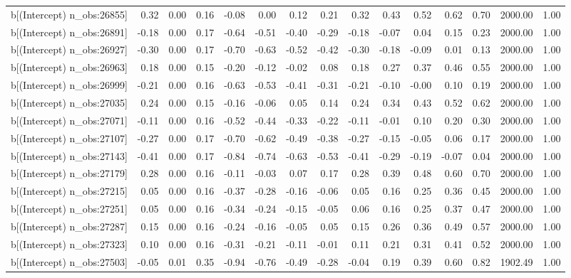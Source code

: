 \begin{table}[ht]
\begin{tabular}{rrrrrrrrrrrrrrr}
  b[(Intercept) n\_obs:26855] & 0.32 & 0.00 & 0.16 & -0.08 & 0.00 & 0.12 & 0.21 & 0.32 & 0.43 & 0.52 & 0.62 & 0.70 & 2000.00 & 1.00 \\ 
  b[(Intercept) n\_obs:26891] & -0.18 & 0.00 & 0.17 & -0.64 & -0.51 & -0.40 & -0.29 & -0.18 & -0.07 & 0.04 & 0.15 & 0.23 & 2000.00 & 1.00 \\ 
  b[(Intercept) n\_obs:26927] & -0.30 & 0.00 & 0.17 & -0.70 & -0.63 & -0.52 & -0.42 & -0.30 & -0.18 & -0.09 & 0.01 & 0.13 & 2000.00 & 1.00 \\ 
  b[(Intercept) n\_obs:26963] & 0.18 & 0.00 & 0.15 & -0.20 & -0.12 & -0.02 & 0.08 & 0.18 & 0.27 & 0.37 & 0.46 & 0.55 & 2000.00 & 1.00 \\ 
  b[(Intercept) n\_obs:26999] & -0.21 & 0.00 & 0.16 & -0.63 & -0.53 & -0.41 & -0.31 & -0.21 & -0.10 & -0.00 & 0.10 & 0.19 & 2000.00 & 1.00 \\ 
  b[(Intercept) n\_obs:27035] & 0.24 & 0.00 & 0.15 & -0.16 & -0.06 & 0.05 & 0.14 & 0.24 & 0.34 & 0.43 & 0.52 & 0.62 & 2000.00 & 1.00 \\ 
  b[(Intercept) n\_obs:27071] & -0.11 & 0.00 & 0.16 & -0.52 & -0.44 & -0.33 & -0.22 & -0.11 & -0.01 & 0.10 & 0.20 & 0.30 & 2000.00 & 1.00 \\ 
  b[(Intercept) n\_obs:27107] & -0.27 & 0.00 & 0.17 & -0.70 & -0.62 & -0.49 & -0.38 & -0.27 & -0.15 & -0.05 & 0.06 & 0.17 & 2000.00 & 1.00 \\ 
  b[(Intercept) n\_obs:27143] & -0.41 & 0.00 & 0.17 & -0.84 & -0.74 & -0.63 & -0.53 & -0.41 & -0.29 & -0.19 & -0.07 & 0.04 & 2000.00 & 1.00 \\ 
  b[(Intercept) n\_obs:27179] & 0.28 & 0.00 & 0.16 & -0.11 & -0.03 & 0.07 & 0.17 & 0.28 & 0.39 & 0.48 & 0.60 & 0.70 & 2000.00 & 1.00 \\ 
  b[(Intercept) n\_obs:27215] & 0.05 & 0.00 & 0.16 & -0.37 & -0.28 & -0.16 & -0.06 & 0.05 & 0.16 & 0.25 & 0.36 & 0.45 & 2000.00 & 1.00 \\ 
  b[(Intercept) n\_obs:27251] & 0.05 & 0.00 & 0.16 & -0.34 & -0.24 & -0.15 & -0.05 & 0.06 & 0.16 & 0.25 & 0.37 & 0.47 & 2000.00 & 1.00 \\ 
  b[(Intercept) n\_obs:27287] & 0.15 & 0.00 & 0.16 & -0.24 & -0.16 & -0.05 & 0.05 & 0.15 & 0.26 & 0.36 & 0.49 & 0.57 & 2000.00 & 1.00 \\ 
  b[(Intercept) n\_obs:27323] & 0.10 & 0.00 & 0.16 & -0.31 & -0.21 & -0.11 & -0.01 & 0.11 & 0.21 & 0.31 & 0.41 & 0.52 & 2000.00 & 1.00 \\ 
  b[(Intercept) n\_obs:27503] & -0.05 & 0.01 & 0.35 & -0.94 & -0.76 & -0.49 & -0.28 & -0.04 & 0.19 & 0.39 & 0.60 & 0.82 & 1902.49 & 1.00 \\ 

\end{tabular}
\end{table}
